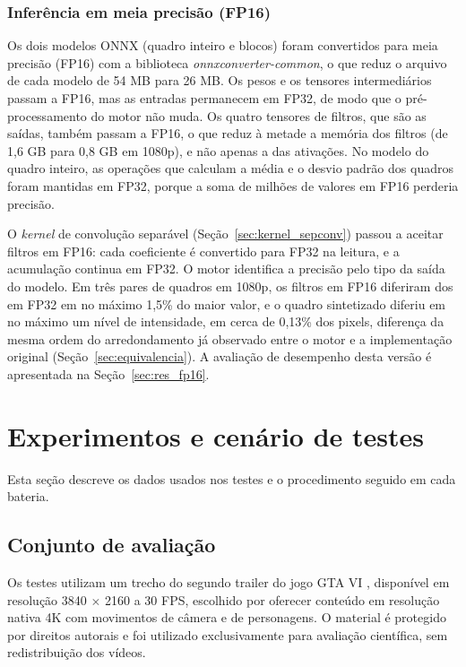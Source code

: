 \documentclass[
    12pt,                %
    openright,           %
    oneside,             %
    a4paper,             %
    english,             %
    brazil               %
]{abntex2}
\begin{document}
\subsubsection{Inferência em meia precisão (FP16)}

Os dois modelos ONNX (quadro inteiro e blocos) foram convertidos para meia precisão (FP16) com a biblioteca \textit{onnxconverter-common}, o que reduz o arquivo de cada modelo de 54 MB para 26 MB. Os pesos e os tensores intermediários passam a FP16, mas as entradas permanecem em FP32, de modo que o pré-processamento do motor não muda. Os quatro tensores de filtros, que são as saídas, também passam a FP16, o que reduz à metade a memória dos filtros (de 1,6 GB para 0,8 GB em 1080p), e não apenas a das ativações. No modelo do quadro inteiro, as operações que calculam a média e o desvio padrão dos quadros foram mantidas em FP32, porque a soma de milhões de valores em FP16 perderia precisão.

O \textit{kernel} de convolução separável (Seção~\ref{sec:kernel_sepconv}) passou a aceitar filtros em FP16: cada coeficiente é convertido para FP32 na leitura, e a acumulação continua em FP32. O motor identifica a precisão pelo tipo da saída do modelo. Em três pares de quadros em 1080p, os filtros em FP16 diferiram dos em FP32 em no máximo 1,5\% do maior valor, e o quadro sintetizado diferiu em no máximo um nível de intensidade, em cerca de 0,13\% dos pixels, diferença da mesma ordem do arredondamento já observado entre o motor e a implementação original (Seção~\ref{sec:equivalencia}). A avaliação de desempenho desta versão é apresentada na Seção~\ref{sec:res_fp16}.

\section{Experimentos e cenário de testes}
\label{sec:experimentos}

Esta seção descreve os dados usados nos testes e o procedimento seguido em cada bateria.

\subsection{Conjunto de avaliação}
\label{sec:dataset}

Os testes utilizam um trecho do segundo trailer do jogo GTA VI \cite{Rockstar2025GTAVI}, disponível em resolução 3840 $\times$ 2160 a 30 FPS, escolhido por oferecer conteúdo em resolução nativa 4K com movimentos de câmera e de personagens. O material é protegido por direitos autorais e foi utilizado exclusivamente para avaliação científica, sem redistribuição dos vídeos.
\end{document}
